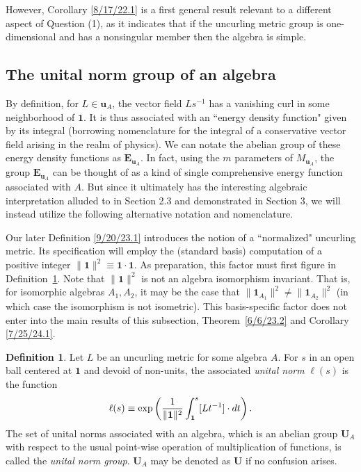 \documentclass{amsart}
\numberwithin{equation}{section}
\theoremstyle{definition}
\newtheorem{definition}[theorem]{Definition}
\numberwithin{theorem}{section}
\begin{document}
However, Corollary \ref{8/17/22.1} is a first general result relevant to a different aspect of Question (1), as it indicates that if the uncurling metric group is one-dimensional and has a nonsingular member then the algebra is simple.  



\subsection{The unital norm group of an algebra} By definition, for \mbox{$L\in \mathbf{u}_A$}, the vector field $Ls^{-1}$ has a vanishing curl in some neighborhood of $\mathbf{1}$.  It is thus associated with an ``energy density function" given by its integral (borrowing nomenclature for the integral of a conservative vector field arising in the realm of physics).   
 We can notate the abelian group of these energy density functions as $\mathbf{E}_{\mathbf{u}_A}$.  In fact, using the $m$ parameters of $M_{\mathbf{u}_A}$, the group $\mathbf{E}_{\mathbf{u}_A}$ can be thought of as a kind of single comprehensive energy function associated with $A$.  But since it ultimately has the interesting algebraic interpretation alluded to in Section 2.3 and demonstrated in Section 3, we will instead utilize the following alternative notation and nomenclature.
  
Our later Definition \ref{9/20/23.1} introduces the notion of a ``normalized" uncurling metric.  Its specification will employ the (standard basis) computation of a positive integer $\|\mathbf{1}\|^2 \equiv \mathbf{1} \cdot \mathbf{1}$. As preparation, this factor must first figure in \mbox{Definition \ref{9/21/23.2}}.   Note that $\|\mathbf{1}\|^2$ is not an algebra isomorphism invariant.  That is, for isomorphic algebras $A_1,A_2$, it may be the case that $\|\mathbf{1}_{A_1}\|^2 \ne \|\mathbf{1}_{A_2}\|^2$ (in which case the isomorphism is not isometric).  This basis-specific factor does not enter into the main results of this subsection, \mbox{Theorem \ref{6/6/23.2}} and Corollary \ref{7/25/24.1}.
  
  
\enlargethispage{1cm}
  \begin{definition}\label{9/21/23.2} Let $L$ be an uncurling metric for some algebra $A$.  For $s$ in an open ball centered at $\mathbf{1}$ and devoid of non-units, the associated {\it unital norm} $ \ell(s)$ is the function 
  \begin{equation}\label{11/7/20.2}   \ell(s) \equiv \exp\left({\frac{1}{\|{\bf 1}\|^2}\int_{\bf 1}^s [Lt^{-1}]\cdot dt}\right).\end{equation} 
   The set of unital norms associated with an algebra, which is an abelian group $\mathbf{U}_A$ with respect to the usual point-wise operation of multiplication of functions, is called the {\it unital norm group}. $\mathbf{U}_A$ may be denoted as $\mathbf{U}$ if no confusion arises. \end{definition} 
   
\end{document}

